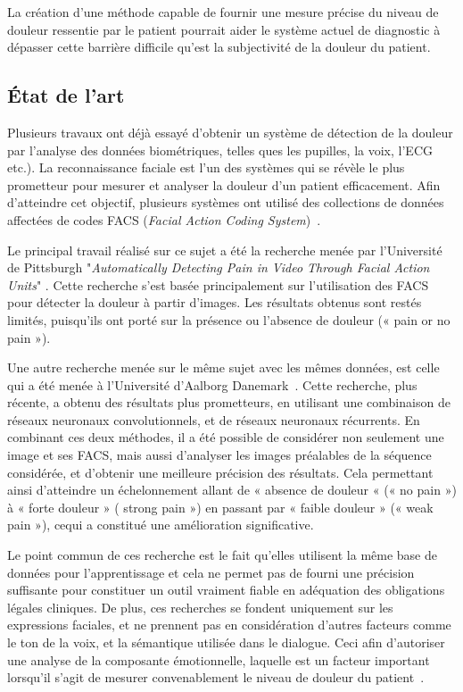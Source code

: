 \documentclass[11pt]{article}
\begin{document}
La création  d’une méthode capable  de fournir une  mesure précise du  niveau de
douleur ressentie par le patient pourrait  aider le système actuel de diagnostic
à dépasser  cette barrière  difficile qu'est  la subjectivité  de la  douleur du
patient.


\subsection{\'Etat de l'art}
\label{sec:org08f9dfb}

Plusieurs travaux ont  d\'ej\`a essayé d’obtenir un système de détection de la douleur par l’analyse des
données biométriques, telles ques  les pupilles, la voix, l'ECG etc.). La reconnaissance
faciale est l'un des systèmes qui se révèle le plus prometteur pour mesurer et
analyser la douleur d'un patient efficacement.  Afin d’atteindre
cet objectif, plusieurs systèmes ont utilisé des collections de données
affectées de codes FACS (\emph{Facial Action Coding System})~\cite{lucey2011painful}. 

Le principal travail réalisé sur ce sujet a été la recherche menée par
l’Université de Pittsburgh "\emph{Automatically Detecting Pain in Video Through Facial
Action Units}" \cite{lucey2011automatically}. Cette recherche s’est basée principalement sur l’utilisation
des FACS pour détecter la douleur à partir d'images. Les résultats obtenus
sont restés limités, puisqu'ils ont porté sur la présence ou l’absence de douleur («
pain or no pain »). 

Une autre recherche  menée sur le même  sujet avec les mêmes  données, est celle
qui        a       été        menée        à       l’Université        d’Aalborg
Danemark~\cite{bellantonio2016spatio}. Cette  recherche, plus récente,  a obtenu
des  résultats  plus  prometteurs,  en  utilisant  une  combinaison  de  réseaux
neuronaux convolutionnels, et de réseaux neuronaux récurrents.  En combinant ces
deux méthodes, il  a été possible de  considérer non seulement une  image et ses
FACS, mais aussi d’analyser les images  préalables de la séquence considérée, et
d’obtenir  une   meilleure  précision  des  résultats.   Cela  permettant  ainsi
d’atteindre un échelonnement allant de « absence de  douleur « (« no pain ») à «
forte douleur » ( strong pain ») en  passant par « faible douleur » (« weak pain
»), cequi a constitué une amélioration significative.

Le point commun de ces recherche est le fait qu’elles utilisent la même base de
données pour l’apprentissage et cela ne permet pas de fourni une précision
suffisante pour constituer un outil vraiment fiable en adéquation des
obligations légales cliniques. De plus, ces recherches se fondent uniquement sur
les expressions faciales, et ne prennent pas en considération d’autres facteurs
comme le ton de la voix, et la sémantique utilisée dans le dialogue.  Ceci afin
d’autoriser une analyse de la composante émotionnelle, laquelle est un facteur
important lorsqu’il s’agit de mesurer convenablement le niveau de douleur du
patient~\cite{hale1997emotional}.   
\end{document}
